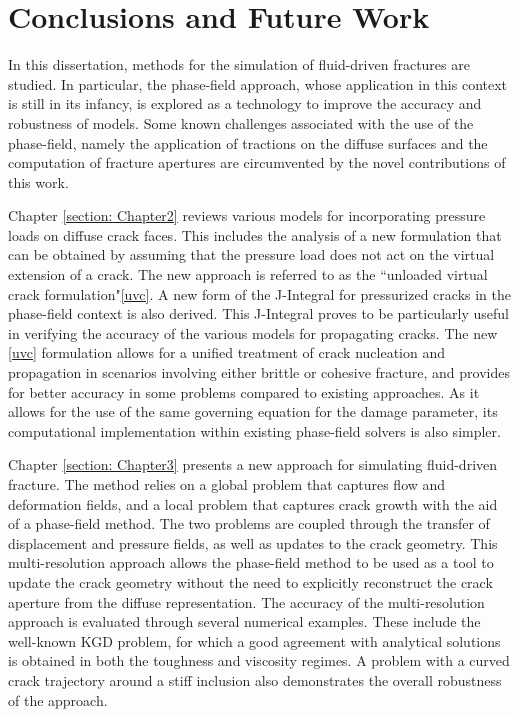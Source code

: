 \chapter{Conclusions and Future Work}
\label{section: Conclusions}

In this dissertation, methods for the simulation of fluid-driven fractures are studied. In particular, the phase-field approach, whose application in this context is still in its infancy, is explored as a technology to improve the accuracy and robustness of models. Some known challenges associated with the use of the phase-field, namely the application of tractions on the diffuse surfaces and the computation of fracture apertures are circumvented by the novel contributions of this work. 

Chapter \ref{section: Chapter2} reviews various models for incorporating pressure loads on diffuse crack faces. This includes the analysis of a new formulation that can be obtained by assuming that the pressure load does not act on the virtual extension of a crack. The new approach is referred to as the 
 ``unloaded virtual crack formulation"\eqref{uvc}. A new form of the J-Integral for pressurized cracks in the phase-field context is also derived. This J-Integral proves to be particularly useful in verifying the accuracy of the various models for propagating cracks. The new \eqref{uvc} formulation allows for a unified treatment of crack nucleation and propagation in scenarios involving either brittle or cohesive fracture, and provides for better accuracy in some problems compared to existing approaches. As it allows for the use of the same governing equation for the damage parameter, its computational implementation within existing phase-field solvers is also simpler. 

Chapter \ref{section: Chapter3} presents a new approach for simulating fluid-driven fracture. The method relies on a global problem that captures flow and deformation fields, and a local problem that captures crack growth with the aid of a phase-field method. The two problems are coupled through the transfer of displacement and pressure fields, as well as updates to the crack geometry. This multi-resolution approach allows the phase-field method to be used as a tool to update the crack geometry without the need to explicitly reconstruct the crack aperture from the diffuse representation.  The accuracy of the multi-resolution approach is evaluated through several numerical examples. These include the well-known KGD problem, for which a good agreement with analytical solutions is obtained in both the toughness and viscosity regimes. A problem with a curved crack trajectory around a stiff inclusion also demonstrates the overall robustness of the approach.  

